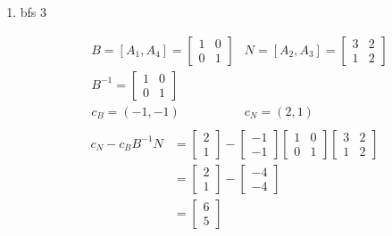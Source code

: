 \documentclass[11pt]{article}
\begin{document}
\begin{enumerate}
    \item bfs 3\par
    \begin{align*}
        & B = [A_1, A_4] = \begin{bmatrix}1 & 0 \\ 0 & 1\end{bmatrix} & N = [A_2, A_3] = \begin{bmatrix}3 & 2 \\ 1 & 2\end{bmatrix}\\
        & B^{-1} = \begin{bmatrix} 1 & 0 \\ 0 & 1\end{bmatrix} & \\
        & c_B = (-1, -1) & c_N =(2, 1)\\
    \end{align*}
    \begin{align*}
         c_N - c_B B^{-1}N &= \begin{bmatrix} 2 \\ 1 \end{bmatrix} - \begin{bmatrix} -1 \\ -1 \end{bmatrix} \begin{bmatrix} 1 & 0 \\ 0 & 1\end{bmatrix} \begin{bmatrix}3 & 2 \\ 1 & 2\end{bmatrix} \\
        &= \begin{bmatrix} 2 \\ 1 \end{bmatrix} - \begin{bmatrix} -4 \\ -4 \end{bmatrix} \\
        &= \begin{bmatrix} 6 \\ 5 \end{bmatrix}
    \end{align*}
    

\end{enumerate}
\end{document}
